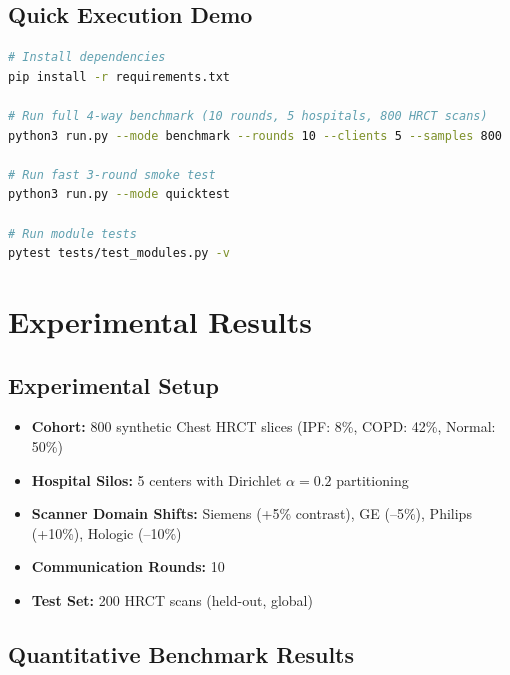 \documentclass[12pt,a4paper]{report}
\begin{document}
\section{Quick Execution Demo}

\begin{lstlisting}[language=bash, caption={Running the 4-way Comparative Benchmark}, label={lst:run}]
# Install dependencies
pip install -r requirements.txt

# Run full 4-way benchmark (10 rounds, 5 hospitals, 800 HRCT scans)
python3 run.py --mode benchmark --rounds 10 --clients 5 --samples 800

# Run fast 3-round smoke test
python3 run.py --mode quicktest

# Run module tests
pytest tests/test_modules.py -v
\end{lstlisting}

\newpage

\chapter{Experimental Results}
\label{ch:results}

\section{Experimental Setup}
\begin{itemize}
    \item \textbf{Cohort:} 800 synthetic Chest HRCT slices (IPF: 8\%, COPD: 42\%, Normal: 50\%)
    \item \textbf{Hospital Silos:} 5 centers with Dirichlet $\alpha=0.2$ partitioning
    \item \textbf{Scanner Domain Shifts:} Siemens (+5\% contrast), GE (–5\%), Philips (+10\%), Hologic (–10\%)
    \item \textbf{Communication Rounds:} 10
    \item \textbf{Test Set:} 200 HRCT scans (held-out, global)
\end{itemize}

\section{Quantitative Benchmark Results}
\end{document}

